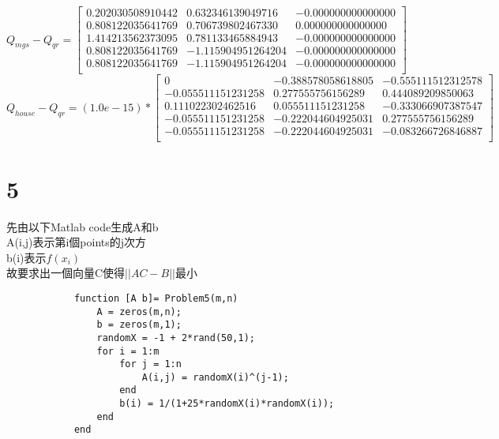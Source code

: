 \documentclass{article}
\begin{document}
            \begin{equation*}
                Q_{mgs} - Q_{qr} = \left[
                \begin{array}{ccc}
                    0.202030508910442 &  0.632346139049716 & -0.000000000000000\\
                    0.808122035641769 &  0.706739802467330 &  0.000000000000000\\
                    1.414213562373095 &  0.781133465884943 & -0.000000000000000\\
                    0.808122035641769 & -1.115904951264204 & -0.000000000000000\\
                    0.808122035641769 & -1.115904951264204 & -0.000000000000000\\
                \end{array}
                \right]
            \end{equation*}
            \begin{equation*}
                Q_{house} - Q_{qr} = (1.0e-15) * \left[
                \begin{array}{ccc}
                    0 & -0.388578058618805 & -0.555111512312578\\
                    -0.055511151231258 &  0.277555756156289 &  0.444089209850063\\
                     0.111022302462516 &  0.055511151231258 & -0.333066907387547\\
                    -0.055511151231258 & -0.222044604925031 &  0.277555756156289\\
                    -0.055511151231258 & -0.222044604925031 & -0.083266726846887\\
                \end{array}
                \right]
            \end{equation*}
    \newpage
    \section*{5}
        先由以下Matlab code生成A和b\\
        A(i,j)表示第i個points的j次方\\
        b(i)表示$f(x_i)$\\
        故要求出一個向量C使得$||AC-B||$最小\\
        \lstset{language=Matlab}
        \begin{lstlisting}
            function [A b]= Problem5(m,n)
                A = zeros(m,n);
                b = zeros(m,1);
                randomX = -1 + 2*rand(50,1);
                for i = 1:m
                    for j = 1:n
                        A(i,j) = randomX(i)^(j-1);
                    end
                    b(i) = 1/(1+25*randomX(i)*randomX(i));
                end
            end
        \end{lstlisting} 
\end{document}
